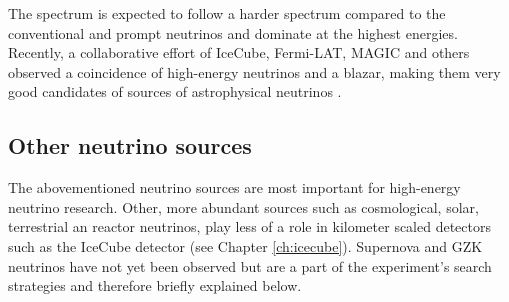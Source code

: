 The spectrum is expected to follow a harder spectrum compared to the conventional and prompt neutrinos and dominate at the highest energies.\\

\noindent Recently, a collaborative effort of IceCube, Fermi-LAT, MAGIC and others observed a coincidence of high-energy neutrinos and a blazar, making them very good candidates of sources of astrophysical neutrinos \cite{IceCube:2018dnn}.

\subsection{Other neutrino sources}
The abovementioned neutrino sources are most important for high-energy neutrino research. Other, more abundant sources such as cosmological, solar, terrestrial an reactor neutrinos, play less of a role in kilometer scaled detectors such as the IceCube detector (see Chapter \ref{ch:icecube}). Supernova and GZK neutrinos have not yet been observed but are a part of the experiment's search strategies and therefore briefly explained below.

 


